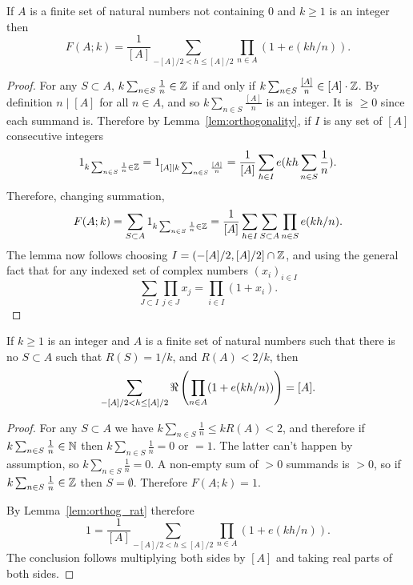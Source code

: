 \begin{lemma}\label{lem:orthog_rat}
  \leanok
If $A$ is a finite set of natural numbers not containing $0$ and $k\geq 1$ is an integer then
\[F(A;k)= \frac{1}{[A]}\sum_{-[A]/2< h\leq [A]/2}\prod_{n\in A}(1+e(kh/n)).\]
\end{lemma}
\begin{proof}
  \leanok
{}
For any $S\subset A$,  $k\sum_{n\in S}\frac{1}{n}\in \mathbb{Z}$ if and only if $k\sum_{n\in S}\frac{[A]}{n}\in [A]\cdot \mathbb{Z}$. By definition $n\mid [A]$ for all $n\in A$, and so $k\sum_{n\in S}\frac{[A]}{n}$ is an integer. It is $\geq 0$ since each summand is. Therefore by Lemma~\ref{lem:orthogonality}, if $I$ is any set of $[A]$ consecutive integers
\[1_{k\sum_{n\in S}\frac{1}{n}\in \mathbb{Z}}=1_{[A]\mid k\sum_{n\in S}\frac{[A]}{n}} = \frac{1}{[A]}\sum_{h\in I}e(kh\sum_{n\in S}\frac{1}{n}).\]
Therefore, changing summation,
\[F(A;k) = \sum_{S\subset A}1_{k\sum_{n\in S}\frac{1}{n}\in \mathbb{Z}} = \frac{1}{[A]} \sum_{h\in I}\sum_{S\subset A}\prod_{n\in S}e(kh/n).\]
The lemma now follows choosing $I=(-[A]/2,[A]/2]\cap\mathbb{Z}$, and using the general fact that for any indexed set of complex numbers $(x_i)_{i\in I}$
\[\sum_{J\subset I}\prod_{j\in J}x_j = \prod_{i\in I}(1+x_i).\]
\end{proof}

\begin{lemma}\label{lem:orthog_simp}
  \leanok
If $k\geq 1$ is an integer and $A$ is a finite set of natural numbers such that there is no $S\subset A$ such that $R(S)=1/k$, and $R(A)<2/k$, then
\[\sum_{-[A]/2< h\leq [A]/2}\Re\left( \prod_{n\in A}(1+e(kh/n))\right)= [A].\]
\end{lemma}
\begin{proof}
  \leanok
For any $S\subset A$ we have $k\sum_{n\in S}\frac{1}{n}\leq kR(A)<2$, and therefore if $k\sum_{n\in S}\frac{1}{n} \in \mathbb{N}$ then $k\sum_{n\in S}\frac{1}{n} =0$ or $=1$. The latter can't happen by assumption, so $k\sum_{n\in S}\frac{1}{n} =0$. A non-empty sum of $>0$ summands is $>0$, so if $k\sum_{n\in S}\frac{1}{n}\in \mathbb{Z}$ then $S=\emptyset$. Therefore $F(A;k)=1$.

By Lemma~\ref{lem:orthog_rat} therefore
\[1=\frac{1}{[A]}\sum_{-[A]/2< h\leq [A]/2}\prod_{n\in A}(1+e(kh/n)).\]
The conclusion follows multiplying both sides by $[A]$ and taking real parts of both sides.
\end{proof}

